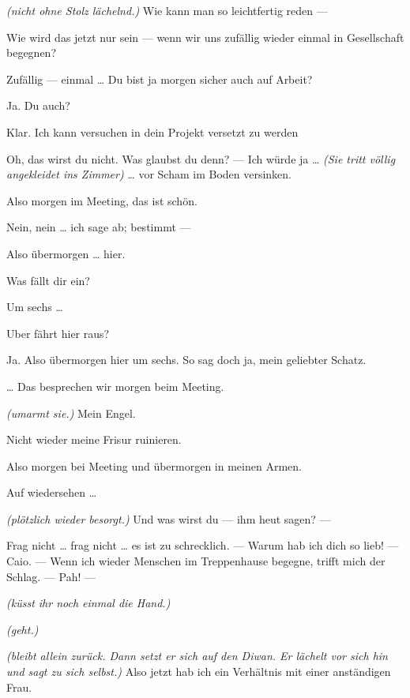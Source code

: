\documentclass[
	final,
	a4paper,
	ngerman,
	mpinclude = true, %
	twoside = true,
	open = right,
	cleardoublepage = plain,
	DIV = 13,
	BCOR = 1cm,
	titlepage = firstiscover,
	]{scrbook}
\newcommand{\direction}[1]{\textit{(#1)}}
\newcommand{\thecharacter}[1]{\textup{\textsc{#1}}\xspace}
\newcommand{\theherr}{\thecharacter{Benjamin}}
\newcommand{\thefrau}{\thecharacter{Emma}}
\newcommand{\character}[1]{\item[#1:]}
\newcommand{\herr}{\character{\theherr}}
\newcommand{\frau}{\character{\thefrau}}
\begin{document}
\begin{play}
	\herr
	\direction{nicht ohne Stolz lächelnd.} Wie kann man so leichtfertig reden ---

	\frau
	Wie wird das jetzt nur sein --- wenn wir uns zufällig wieder einmal in Gesellschaft begegnen?

	\herr
	Zufällig --- einmal \ldots{} Du bist ja morgen sicher auch auf Arbeit?

	\frau
	Ja. Du auch?

	\herr
	Klar. Ich kann versuchen in dein Projekt versetzt zu werden

	\frau
	Oh, das wirst du nicht. Was glaubst du denn? --- Ich würde ja \ldots{} \direction{Sie tritt völlig angekleidet ins Zimmer} \ldots{} vor Scham im Boden versinken.

	\herr
	Also morgen im Meeting, das ist schön.

	\frau
	Nein, nein \ldots{} ich sage ab; bestimmt ---

	\herr
	Also übermorgen \ldots{} hier.

	\frau
	Was fällt dir ein?

	\herr
	Um sechs \ldots{}

	\frau
	Uber fährt hier raus?

	\herr
	Ja. Also übermorgen hier um sechs. So sag doch ja, mein geliebter Schatz.

	\frau
	\ldots{} Das besprechen wir morgen beim Meeting.

	\herr
	\direction{umarmt sie.} Mein Engel.

	\frau
	Nicht wieder meine Frisur ruinieren.

	\herr
	Also morgen bei Meeting und übermorgen in meinen Armen.

	\frau
	Auf wiedersehen \ldots{}

	\herr
	\direction{plötzlich wieder besorgt.} Und was wirst du --- ihm heut sagen? ---

	\frau
	Frag nicht \ldots{} frag nicht \ldots{} es ist zu schrecklich. --- Warum hab ich dich so lieb! --- Caio. --- Wenn ich wieder Menschen im Treppenhause begegne, trifft mich der Schlag. --- Pah! ---

	\herr
	\direction{küsst ihr noch einmal die Hand.}

	\frau
	\direction{geht.}

	\herr
	\direction{bleibt allein zurück. Dann setzt er sich auf den Diwan. Er lächelt vor sich hin und sagt zu sich selbst.} Also jetzt hab ich ein Verhältnis mit einer anständigen Frau.

\end{play}
\end{document}

